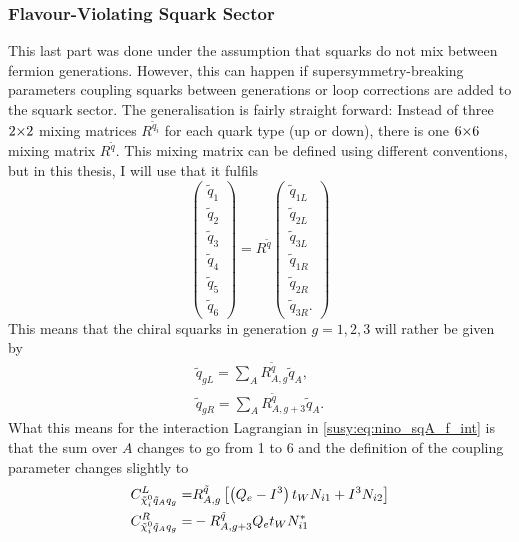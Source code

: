 \documentclass[../main.tex]{subfiles}
\begin{document}
\subsubsection*{Flavour-Violating Squark Sector}
This last part was done under the assumption that squarks do not mix between fermion generations.
However, this can happen if supersymmetry-breaking parameters coupling squarks between generations or loop corrections are added to the squark sector.
The generalisation is fairly straight forward: Instead of three \(2 {\times} 2\) mixing matrices \(R^{\tilde{q}_i}\) for each quark type (up or down), there is one \(6 {\times} 6\) mixing matrix \(R^{\tilde{q}}\).
This mixing matrix can be defined using different conventions, but in this thesis, I will use that it fulfils
\begin{equation}
  \begin{pmatrix}
    \tilde{q}_1 \\ \tilde{q}_2 \\ \tilde{q}_3 \\ \tilde{q}_4 \\ \tilde{q}_5 \\ \tilde{q}_6
  \end{pmatrix}
  = R^{\tilde{q}} \begin{pmatrix}
    \tilde{q}_{1L} \\ \tilde{q}_{2L} \\ \tilde{q}_{3L} \\ \tilde{q}_{1R} \\ \tilde{q}_{2R} \\ \tilde{q}_{3R}.
  \end{pmatrix}
\end{equation}
This means that the chiral squarks in generation \(g = 1,2,3\) will rather be given by
\begin{subequations}
  \begin{align}
    \tilde{q}_{gL} = \sum_A R^{\tilde{q}}_{A,g} \tilde{q}_A, \\
    \tilde{q}_{gR} = \sum_A R^{\tilde{q}}_{A,g+3} \tilde{q}_A.
  \end{align}
\end{subequations}
What this means for the interaction Lagrangian in \cref{susy:eq:nino_sqA_f_int} is that the sum over \(A\) changes to go from 1 to 6 and the definition of the coupling parameter changes slightly to
\begin{subequations}
  \begin{align}
    C^{L}_{\tilde\chi_i^0 \tilde{q}_A q_g} = & R^{\tilde{q}}_{A,g} \left[\left(Q_e-I^3\right)t_W N_{i1} + I^3 N_{i2}\right] \\
    C^{R}_{\tilde\chi_i^0 \tilde{q}_A q_g} = & -R^{\tilde{q}}_{A,g+3} Q_e t_W N_{i1}^\ast
  \end{align}
\end{subequations}
\end{document}
